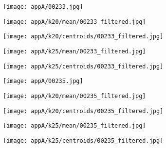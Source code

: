 \documentclass[draft,final]{vutinfth} %
\begin{document}
\begin{appendices}
\begin{figure}[h]
\centering
  \begin{subfigure}[b]{0.19\columnwidth}
    \centering
    \texttt{[image: appA/00233.jpg]}
  \end{subfigure}
  \begin{subfigure}[b]{0.19\columnwidth}
    \centering
    \texttt{[image: appA/k20/mean/00233\_filtered.jpg]}
  \end{subfigure}
  \begin{subfigure}[b]{0.19\columnwidth}
    \centering
    \texttt{[image: appA/k20/centroids/00233\_filtered.jpg]}
  \end{subfigure}
  \begin{subfigure}[b]{0.19\columnwidth}
    \centering
    \texttt{[image: appA/k25/mean/00233\_filtered.jpg]}
  \end{subfigure}
  \begin{subfigure}[b]{0.19\columnwidth}
    \centering
    \texttt{[image: appA/k25/centroids/00233\_filtered.jpg]}
  \end{subfigure}
\caption{}
\end{figure}  

\begin{figure}[h]
\centering
  \begin{subfigure}[b]{0.19\columnwidth}
    \centering
    \texttt{[image: appA/00235.jpg]}
  \end{subfigure}
  \begin{subfigure}[b]{0.19\columnwidth}
    \centering
    \texttt{[image: appA/k20/mean/00235\_filtered.jpg]}
  \end{subfigure}
  \begin{subfigure}[b]{0.19\columnwidth}
    \centering
    \texttt{[image: appA/k20/centroids/00235\_filtered.jpg]}
  \end{subfigure}
  \begin{subfigure}[b]{0.19\columnwidth}
    \centering
    \texttt{[image: appA/k25/mean/00235\_filtered.jpg]}
  \end{subfigure}
  \begin{subfigure}[b]{0.19\columnwidth}
    \centering
    \texttt{[image: appA/k25/centroids/00235\_filtered.jpg]}
  \end{subfigure}
\caption{}
\end{figure}  


\end{appendices}
\end{document}

